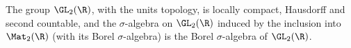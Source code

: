 The group $\GL_2(\R)$, with the units topology, is locally compact, Hausdorff and second countable, and the
$\sigma$-algebra on $\GL_2(\R)$ induced by the inclusion into $\Mat_2(\R)$ (with its Borel $\sigma$-algebra) is the
Borel $\sigma$-algebra of $\GL_2(\R)$.
